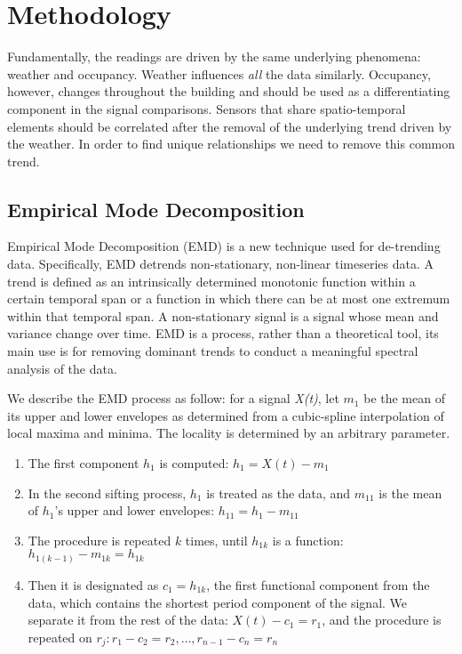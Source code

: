 


\section{Methodology}\label{method}

Fundamentally, the readings are driven by the same underlying phenomena: 
weather and occupancy.  Weather influences \emph{all} the data similarly.  Occupancy, however, changes
throughout the building and should be used as a differentiating component in the signal
comparisons.  Sensors that share spatio-temporal elements should be correlated after the removal
of the underlying trend driven by the weather.  In order to find unique relationships we need to remove 
this common trend.

\subsection{Empirical Mode Decomposition}
Empirical Mode Decomposition (EMD) \cite{huang:emd1998} is a new technique used for de-trending data.
Specifically, EMD detrends non-stationary, non-linear timeseries data.  A trend is defined as 
an intrinsically determined monotonic function within a certain temporal span or a function in which there 
can be at most one extremum within that temporal span.  A non-stationary signal is a signal whose mean and
variance change over time.  EMD is a process, rather than a theoretical tool, its main use is for removing dominant trends to conduct a meaningful spectral analysis of the data.


We describe the EMD process as follow:  for a signal \emph{X(t)}, let $m_1$ be the mean of its upper and
lower envelopes as determined from a cubic-spline interpolation of local maxima and minima. The locality 
is determined by an arbitrary parameter.

\begin{enumerate}
\item The first component $h_1$ is computed: $h_1=X(t)-m_1$
\item In the second sifting process, $h_1$ is treated as the data, and $m_{11}$ is the mean of $h_1$'s upper and lower envelopes: $h_{11}=h_1-m_{11}$
\item The procedure is repeated $k$ times, until $h_{1k}$ is a function: $h_{1(k-1)}-m_{1k}=h_{1k}$
\item Then it is designated as $c_1=h_{1k}$, the first functional component from the data, which contains the shortest period component of the signal. We separate it from the rest of the data: $X(t)-c_1 = r_1$, and the procedure is
repeated on $r_j: r_1-c_2 = r_2,\dots,r_{n-1} - c_n = r_n$
\end{enumerate}


